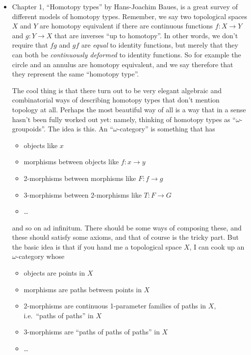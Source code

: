 \documentclass{article}
\def\tightlist{}
\begin{document}
\begin{itemize}
\item
  Chapter 1, ``Homotopy types'' by Hans-Joachim Baues, is a great survey
  of different models of homotopy types. Remember, we say two
  topological spaces \(X\) and \(Y\) are homotopy equivalent if there
  are continuous functions \(f\colon X\to Y\) and \(g\colon Y\to X\)
  that are inverses ``up to homotopy''. In other words, we don't require
  that \(fg\) and \(gf\) are \emph{equal} to identity functions, but
  merely that they can both be \emph{continuously deformed} to identity
  functions. So for example the circle and an annulus are homotopy
  equivalent, and we say therefore that they represent the same
  ``homotopy type''.

  The cool thing is that there turn out to be very elegant algebraic and
  combinatorial ways of describing homotopy types that don't mention
  topology at all. Perhaps the most beautiful way of all is a way that
  in a sense hasn't been fully worked out yet: namely, thinking of
  homotopy types as ``\(\omega\)-groupoids''. The idea is this. An
  ``\(\omega\)-category'' is something that has

  \begin{itemize}
  \tightlist
  \item
    objects like \(x\)
  \item
    morphisms between objects like \(f\colon x\to y\)
  \item
    2-morphisms between morphisms like \(F\colon f\to g\)
  \item
    3-morphisms between 2-morphisms like \(T\colon F\to G\)
  \item
    \ldots{}
  \end{itemize}

  and so on ad infinitum. There should be some ways of composing these,
  and these should satisfy some axioms, and that of course is the tricky
  part. But the basic idea is that if you hand me a topological space
  \(X\), I can cook up an \(\omega\)-category whose

  \begin{itemize}
  \tightlist
  \item
    objects are points in \(X\)
  \item
    morphisms are paths between points in \(X\)
  \item
    2-morphisms are continuous 1-parameter families of paths in \(X\),
    i.e.~``paths of paths'' in \(X\)
  \item
    3-morphisms are ``paths of paths of paths'' in \(X\)
  \item
    \ldots{}
  \end{itemize}


\end{itemize}
\end{document}
